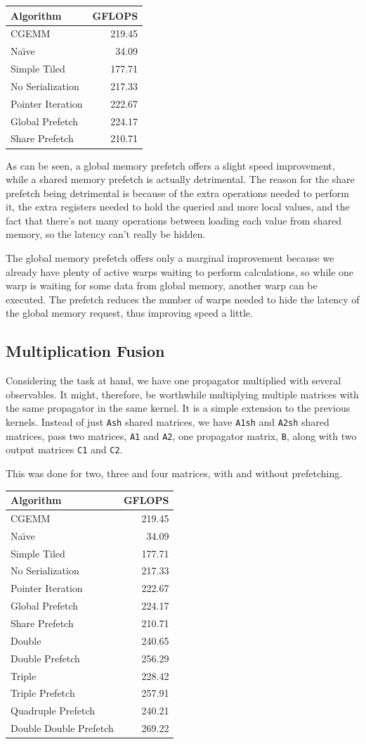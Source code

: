 \documentclass[a4paper,12pt]{report}
\newenvironment{CUDAtiming}%
{\setlength{\extrarowheight}{1.5pt} \begin{center}\begin{tabular}{l|r} Algorithm & GFLOPS\\\hline}%
{\end{tabular}\end{center}}
\begin{document}
\begin{CUDAtiming}
CGEMM & 219.45\\
Na{\"\i}ve & 34.09\\
Simple Tiled & 177.71\\
No Serialization & 217.33\\
Pointer Iteration & 222.67\\
Global Prefetch & 224.17\\
Share Prefetch & 210.71
\end{CUDAtiming}

As can be seen, a global memory prefetch offers a slight speed improvement, while a shared memory prefetch is actually detrimental.
The reason for the share prefetch being detrimental is because of the extra operations needed to perform it, the extra registers needed to hold the queried and more local values, and the fact that there's not many operations between loading each value from shared memory, so the latency can't really be hidden.

The global memory prefetch offers only a marginal improvement because we already have plenty of active warps waiting to perform calculations, so while one warp is waiting for some data from global memory, another warp can be executed.
The prefetch reduces the number of warps needed to hide the latency of the global memory request, thus improving speed a little.


\subsection{Multiplication Fusion}
Considering the task at hand, we have one propagator multiplied with several observables.
It might, therefore, be worthwhile multiplying multiple matrices with the same propagator in the same kernel.
It is a simple extension to the previous kernels.
Instead of just \verb!Ash! shared matrices, we have \verb!A1sh! and \verb!A2sh! shared matrices, pass two matrices, \verb!A1! and \verb!A2!, one propagator matrix, \verb!B!, along with two output matrices \verb!C1! and \verb!C2!.

This was done for two, three and four matrices, with and without prefetching.

\begin{CUDAtiming}
CGEMM & 219.45\\
Na{\"\i}ve & 34.09\\
Simple Tiled & 177.71\\
No Serialization & 217.33\\
Pointer Iteration & 222.67\\
Global Prefetch & 224.17\\
Share Prefetch & 210.71\\
\hline
Double & 240.65\\
Double Prefetch & 256.29\\
Triple & 228.42\\
Triple Prefetch & 257.91\\
Quadruple Prefetch & 240.21\\
Double Double Prefetch & 269.22
\end{CUDAtiming}
\end{document}
